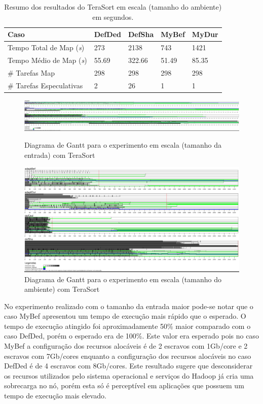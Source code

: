 \begin{table}[h!]
	\caption{Resumo dos resultados do TeraSort em escala (tamanho do ambiente) em segundos.} \label{tab:exp31TS}
	\begin{tabular*}{\hsize}{l|llll} %
		\textbf{Caso} & \textbf{DefDed} & \textbf{DefSha} & \textbf{MyBef} & \textbf{MyDur}\\
		\hline
		Tempo Total de Map ({\it{s}}) & 273 & 2138 & 743 & 1421 \\
		Tempo Médio de Map ({\it{s}}) & 55.69 & 322.66 & 51.49 & 85.35 \\
		\# Tarefas Map & 298 & 298 & 298 & 298 \\
		\# Tarefas Especulativas & 2 & 26 & 1 & 1 \\
	\end{tabular*}
\end{table}
%
%

\begin{figure}
    \centering
	\includegraphics[width=1\textwidth]{figuras/TS-esc-ent.png}
    \caption{Diagrama de Gantt para o experimento em escala (tamanho da entrada) com TeraSort}
	\label{fig:exp3TS}

	\includegraphics[width=1\textwidth]{figuras/TS-esc-amb.png}
    \caption{Diagrama de Gantt para o experimento em escala (tamanho do ambiente) com TeraSort}
	\label{fig:exp31TS}	
\end{figure}

No experimento realizado com o tamanho da entrada maior pode-se notar que o caso MyBef apresentou um tempo de execução mais rápido que o esperado. O tempo de execução atingido foi aproximadamente 50\% maior comparado com o caso DefDed, porém o esperado era de 100\%. Este valor era esperado pois no caso MyBef a configuração dos recursos alocáveis é de 2 escravos com 1Gb/core e 2 escravos com 7Gb/cores enquanto a configuração dos recursos alocáveis no caso DefDed é de 4 escravos com 8Gb/cores. Este resultado sugere que desconsiderar os recursos utilizados pelo sistema operacional e serviços do Hadoop já cria uma sobrecarga no nó, porém esta só é perceptível em aplicações que possuem um tempo de execução mais elevado. 


